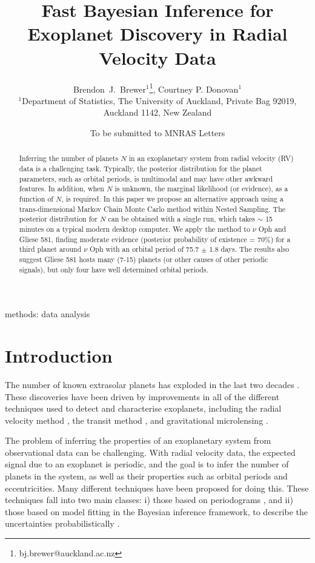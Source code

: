\documentclass[useAMS,usenatbib]{mn2e}
\title[]
{Fast Bayesian Inference for Exoplanet Discovery in Radial Velocity Data}
\author[Brewer]{%
  Brendon~J.~Brewer$^{1}$\thanks{bj.brewer@auckland.ac.nz},
  Courtney P. Donovan$^{1}$
  \medskip\\
  $^1$Department of Statistics, The University of Auckland, Private Bag 92019, Auckland 1142, New Zealand}
\begin{document}
             
\date{To be submitted to MNRAS Letters}
             
\maketitle

\label{firstpage}


\begin{abstract}
Inferring the number of planets $N$ in an exoplanetary system from radial velocity
(RV) data is a challenging task. Typically, the posterior distribution for the
planet parameters, such as orbital periods,
is multimodal and may have other awkward features. In
addition, when $N$ is unknown, the marginal likelihood (or evidence), as a
function of $N$, is required. In this paper we propose an alternative
approach using a trans-dimensional Markov Chain Monte Carlo method within
Nested Sampling. The posterior distribution for $N$ can be obtained with a
single run, which takes $\sim$ 15 minutes on a typical modern desktop computer.
We apply the method to $\nu$ Oph and Gliese 581, finding moderate evidence
(posterior probability of existence = 70\%) for a third planet around
$\nu$ Oph with an orbital period of 75.7 $\pm$ 1.8 days. The results also
suggest Gliese 581 hosts many (7-15) planets (or other causes of other periodic
signals), but only four have well determined orbital periods. 
\end{abstract}

\begin{keywords}
methods: data analysis
\end{keywords}


\section{Introduction}
The number of known extrasolar planets has exploded in the last two
decades \citep{}. These discoveries have been driven by improvements in
all of the different techniques used to detect and characterise exoplanets,
including the radial velocity method \citep[e.g.][]{},
the transit method \citep[e.g.]{},
and gravitational microlensing
\citep[e.g.][]{2014ApJ...785..155B, 2014ApJ...790...14Y}.

The problem of inferring the properties of an
exoplanetary system from observational data can be challenging.
With radial velocity data,
the expected signal due to an exoplanet is periodic, and the goal is to
infer the number of planets in the system, as well as their properties such
as orbital periods and eccentricities. Many
different techniques have been proposed for doing this.
These techniques fall into two main
classes: i) those based on periodograms \citep[e.g.][]{2009A&A...496..577Z},
and ii) those based on model fitting in the Bayesian inference framework,
to describe the uncertainties probabilistically
\citep[e.g.][]{2011MNRAS.410...94G, 2014MNRAS.437.3540F,
2011A&A...528L...5T, fengji}.
\end{document}
